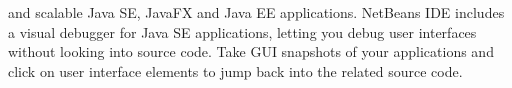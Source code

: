 \documentclass[12pt,a4paper]{article}
\newcommand\tab[1][.7cm]{\hspace*{#1}}
\begin{document}
and scalable Java SE, JavaFX and Java EE applications. NetBeans IDE includes a visual debugger for Java SE applications, letting you debug user interfaces without looking into source code. Take GUI snapshots of your applications and click on user interface elements to jump back into the related source code. 

		
\newpage
\end{document}

